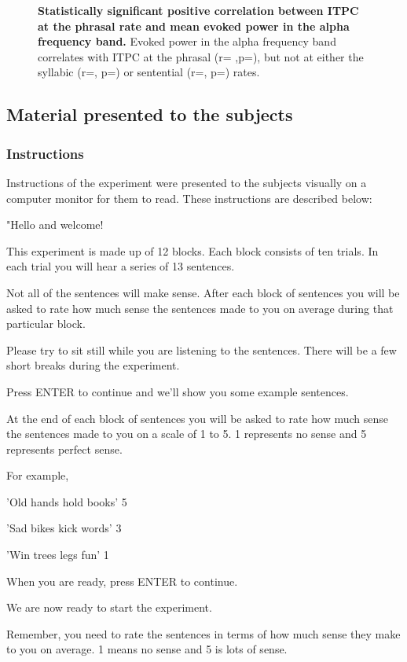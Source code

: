 \documentclass[a4paper,10pt,twoside]{article}
\begin{document}
\begin{figure}[tbhp]
\caption{\textbf{Statistically significant positive correlation between ITPC at the phrasal rate and mean evoked power in the alpha frequency band.} Evoked power in the alpha frequency band correlates with ITPC at the phrasal (r= ,p=), but not at either the syllabic (r=, p=) or sentential (r=, p=) rates.}
\label{Fig4}
\end{figure}


\subsection{Material presented to the subjects}

\subsubsection{Instructions}

Instructions of the experiment were presented to the subjects visually on a computer monitor for them to read. These instructions are described below:

"Hello and welcome!

This experiment is made up of 12 blocks.
Each block consists of ten trials.
In each trial you will hear a series of 13 sentences.

Not all of the sentences will make sense.
After each block of sentences you will be asked to rate how much sense
the sentences made to you on average during that particular block.

Please try to sit still while you are listening to the sentences.
There will be a few short breaks during the experiment.

Press ENTER to continue and we'll show you some example sentences.

At the end of each block of sentences you will be asked to rate how much
sense the sentences made to you on a scale of 1 to 5.
1 represents no sense and 5 represents perfect sense.

For example,

'Old hands hold books'    5 

'Sad bikes kick words'    3   

'Win trees legs fun'      1

When you are ready, press ENTER to continue.

We are now ready to start the experiment.

Remember, you need to rate the sentences in terms of
how much sense they make to you on average.
1 means no sense and 5 is lots of sense.
\end{document}
